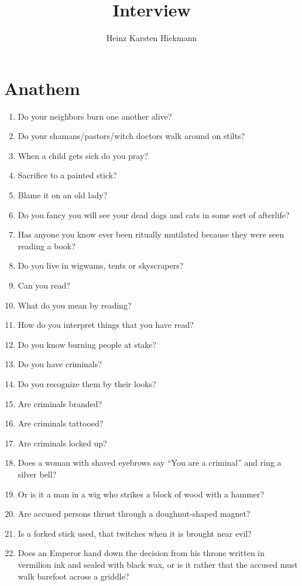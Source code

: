 \documentclass[10pt,a4paper]{article}
\author{Heinz Karsten Hiekmann}
\title{Interview}
\begin{document}
	\maketitle
	\clearpage
\section{Anathem}
	\begin{enumerate}
		\item Do your neighbors burn one another alive?
		\item Do your shamans/pastors/witch doctors walk around on stilts?
		\item When a child gets sick do you pray?
		\item Sacrifice to a painted stick?
		\item Blame it on an old lady?
		\item Do you fancy you will see your dead dogs and cats in some sort of afterlife?
		\item Has anyone you know ever been ritually mutilated because they were seen reading a book?
		\item Do you live in wigwams, tents or skyscrapers?
		\item Can you read?
		\item What do you mean by reading?
		\item How do you interpret things that you have read?
		\item Do you know burning people at stake?
		\item Do you have criminals?
		\item Do you recognize them by their looks?
		\item Are criminals branded?
		\item Are criminals tattooed?
		\item Are criminals locked up?
		\item Does a woman with shaved eyebrows say \enquote{You are a criminal} and ring a silver bell?
		\item Or is it a man in a wig who strikes a block of wood with a hammer?
		\item Are accused persons thrust through a doughnut-shaped magnet?
		\item Is a forked stick used, that twitches when it is brought near evil?
		\item Does an Emperor hand down the decision from his throne written in vermilion ink and sealed with black wax, or is it rather that the accused must walk barefoot across a griddle?

\end{enumerate}
\end{document}
